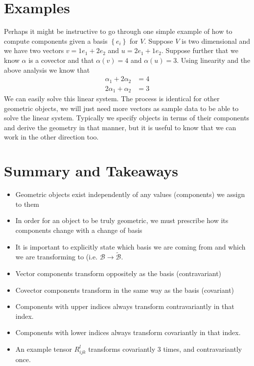 \documentclass[a4paper]{article}
\begin{document}
\section*{Examples}%
Perhaps it might be instructive to go through one simple example of how to compute components given a basis $ \left\{ e_i \right\}$ for $V$. Suppose $V$ is two dimensional and we have two vectors $v = 1 e_1 + 2 e_2$ and $u = 2 e_1 + 1 e_2$. Suppose further that we know $\alpha$ is a covector and that $\alpha(v) = 4$ and $\alpha(u) = 3$. Using linearity and the above analysis we know that
\[
  \begin{aligned}
    \alpha_1 + 2 \alpha_2 &= 4  \\
    2\alpha_1 + \alpha_2 &= 3
  \end{aligned}
\]
We can easily solve this linear system. The process is identical for other geometric objects, we will just need more vectors as sample data to be able to solve the linear system. Typically we specify objects in terms of their components and derive the geometry in that manner, but it is useful to know that we can work in the other direction too.

\section*{Summary and Takeaways}%
\begin{itemize}
  \item Geometric objects exist independently of any values (components) we assign to them
  \item In order for an object to be truly geometric, we must prescribe how its components change with a change of basis
  \item It is important to explicitly state which basis we are coming from and which we are transforming to (i.e. $\mathcal{B} \rightarrow \widetilde{\mathcal{B}}$.
  \item Vector components transform oppositely as the basis (contravariant)
  \item Covector components transform in the same way as the basis (covariant)
  \item Components with upper indices always transform contravariantly in that index.
  \item Components with lower indices always transform covariantly in that index. 
  \item An example tensor $R_{ijk}^l$ transforms covariantly 3 times, and contravariantly once.
\end{itemize}
\end{document}
